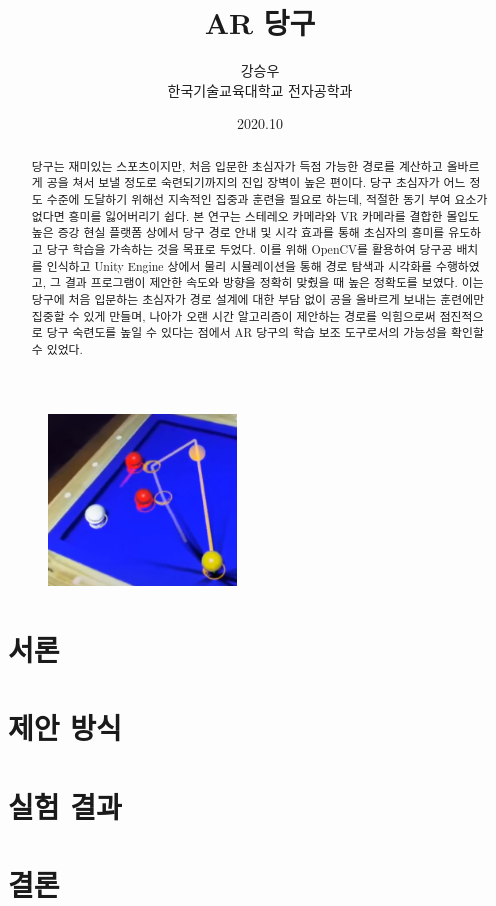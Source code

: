 \documentclass[10pt]{oblivoir}
\title{AR 당구}
\author{강승우 \\ 한국기술교육대학교 전자공학과}
\date{2020.10}
\begin{document}
\maketitle

\begin{figure}[ht]
    \centering
    \includegraphics[width=5cm]{img/abstract-final.png}
\end{figure}

\begin{abstract}
    당구는 재미있는 스포츠이지만, 처음 입문한 초심자가 득점 가능한 경로를 계산하고 올바르게 공을 쳐서 보낼 정도로 숙련되기까지의 진입 장벽이 높은 편이다. 당구 초심자가 어느 정도 수준에 도달하기 위해선 지속적인 집중과 훈련을 필요로 하는데, 적절한 동기 부여 요소가 없다면 흥미를 잃어버리기 쉽다. 본 연구는 스테레오 카메라와 VR 카메라를 결합한 몰입도 높은 증강 현실 플랫폼 상에서 당구 경로 안내 및 시각 효과를 통해 초심자의 흥미를 유도하고 당구 학습을 가속하는 것을 목표로 두었다. 이를 위해 OpenCV를 활용하여 당구공 배치를 인식하고 Unity Engine 상에서 물리 시뮬레이션을 통해 경로 탐색과 시각화를 수행하였고, 그 결과 프로그램이 제안한 속도와 방향을 정확히 맞췄을 때 높은 정확도를 보였다. 이는 당구에 처음 입문하는 초심자가 경로 설계에 대한 부담 없이 공을 올바르게 보내는 훈련에만 집중할 수 있게 만들며, 나아가 오랜 시간 알고리즘이 제안하는 경로를 익힘으로써 점진적으로 당구 숙련도를 높일 수 있다는 점에서 AR 당구의 학습 보조 도구로서의 가능성을 확인할 수 있었다.
\end{abstract}

\newpage
\twocolumn[]

\section{서론}

\section{제안 방식}

\section{실험 결과}

\section{결론}



\end{document}
